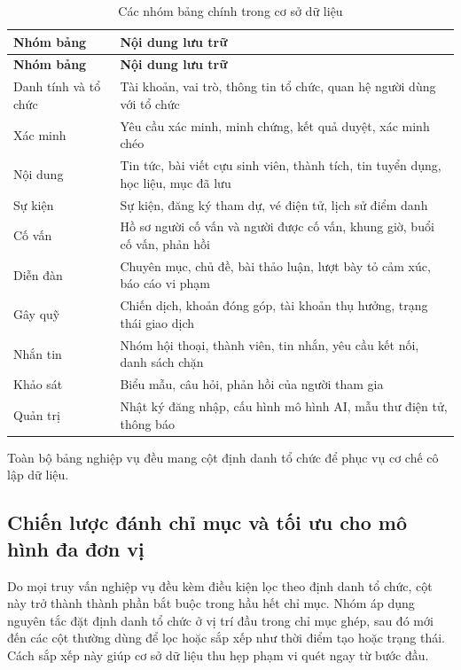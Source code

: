 \documentclass[12pt,a4paper,oneside]{report}
\begin{document}
\renewcommand{\arraystretch}{1.2}
\begin{longtable}{|>{\raggedright\arraybackslash}p{3.4cm}|>{\raggedright\arraybackslash}p{11.1cm}|}
\caption{Các nhóm bảng chính trong cơ sở dữ liệu}\label{tab:tables}\\
\hline \textbf{Nhóm bảng} & \textbf{Nội dung lưu trữ} \\ \hline
\endfirsthead
\hline \textbf{Nhóm bảng} & \textbf{Nội dung lưu trữ} \\ \hline
\endhead
Danh tính và tổ chức & Tài khoản, vai trò, thông tin tổ chức, quan hệ người dùng với tổ chức \\ \hline
Xác minh & Yêu cầu xác minh, minh chứng, kết quả duyệt, xác minh chéo \\ \hline
Nội dung & Tin tức, bài viết cựu sinh viên, thành tích, tin tuyển dụng, học liệu, mục đã lưu \\ \hline
Sự kiện & Sự kiện, đăng ký tham dự, vé điện tử, lịch sử điểm danh \\ \hline
Cố vấn & Hồ sơ người cố vấn và người được cố vấn, khung giờ, buổi cố vấn, phản hồi \\ \hline
Diễn đàn & Chuyên mục, chủ đề, bài thảo luận, lượt bày tỏ cảm xúc, báo cáo vi phạm \\ \hline
Gây quỹ & Chiến dịch, khoản đóng góp, tài khoản thụ hưởng, trạng thái giao dịch \\ \hline
Nhắn tin & Nhóm hội thoại, thành viên, tin nhắn, yêu cầu kết nối, danh sách chặn \\ \hline
Khảo sát & Biểu mẫu, câu hỏi, phản hồi của người tham gia \\ \hline
Quản trị & Nhật ký đăng nhập, cấu hình mô hình AI, mẫu thư điện tử, thông báo \\ \hline
\end{longtable}
\renewcommand{\arraystretch}{1}
Toàn bộ bảng nghiệp vụ đều mang cột định danh tổ chức để phục vụ cơ chế cô lập dữ liệu.

\subsection{Chiến lược đánh chỉ mục và tối ưu cho mô hình đa đơn vị}

Do mọi truy vấn nghiệp vụ đều kèm điều kiện lọc theo định danh tổ chức, cột này trở thành thành phần bắt buộc trong hầu hết chỉ mục. Nhóm áp dụng nguyên tắc đặt định danh tổ chức ở vị trí đầu trong chỉ mục ghép, sau đó mới đến các cột thường dùng để lọc hoặc sắp xếp như thời điểm tạo hoặc trạng thái. Cách sắp xếp này giúp cơ sở dữ liệu thu hẹp phạm vi quét ngay từ bước đầu.
\end{document}
